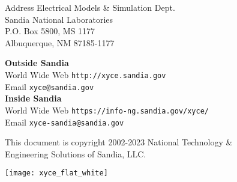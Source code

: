 \begin{flushright}
Address \hfill Electrical Models \& Simulation Dept.\\
     Sandia National Laboratories\\
     P.O. Box 5800, MS 1177\\
     Albuquerque, NM 87185-1177 \\
\end{flushright}

\noindent
\textbf{Outside Sandia}\\
World Wide Web \hfill 
  \texttt{\color{XyceDeepRed}http://xyce.sandia.gov}
\\
Email \hfill
  \texttt{\color{XyceDeepRed}xyce@sandia.gov}
\\

\noindent
\textbf{Inside Sandia}\\
World Wide Web \hfill 
  \texttt{\color{XyceDeepRed}https://info-ng.sandia.gov/xyce/}
\\
Email \hfill
  \texttt{\color{XyceDeepRed}xyce-sandia@sandia.gov}

\vfill
\noindent
\parbox{\textwidth}{
     \parbox{4.1in}{\small This document is copyright \textcopyright{}
     2002-2023 National Technology \&\\Engineering Solutions of Sandia, LLC.}
     \hfill
     \texttt{[image: xyce\_flat\_white]}
}

